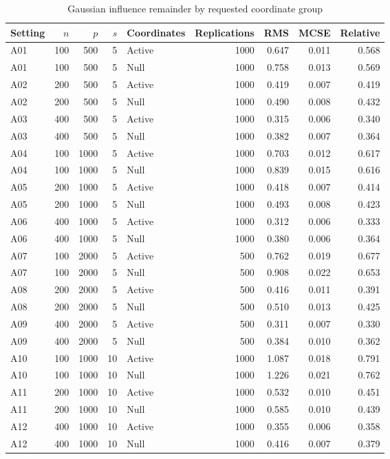 
\begin{longtable}[t]{lrrrlrrrr}
\caption{\label{tab:gaussian-remainder}Gaussian influence remainder by requested coordinate group}\\
\toprule
Setting & $n$ & $p$ & $s$ & Coordinates & Replications & RMS & MCSE & Relative\\
\midrule
A01 & 100 & 500 & 5 & Active & 1000 & 0.647 & 0.011 & 0.568\\
A01 & 100 & 500 & 5 & Null & 1000 & 0.758 & 0.013 & 0.569\\
A02 & 200 & 500 & 5 & Active & 1000 & 0.419 & 0.007 & 0.419\\
A02 & 200 & 500 & 5 & Null & 1000 & 0.490 & 0.008 & 0.432\\
A03 & 400 & 500 & 5 & Active & 1000 & 0.315 & 0.006 & 0.340\\
A03 & 400 & 500 & 5 & Null & 1000 & 0.382 & 0.007 & 0.364\\
A04 & 100 & 1000 & 5 & Active & 1000 & 0.703 & 0.012 & 0.617\\
A04 & 100 & 1000 & 5 & Null & 1000 & 0.839 & 0.015 & 0.616\\
A05 & 200 & 1000 & 5 & Active & 1000 & 0.418 & 0.007 & 0.414\\
A05 & 200 & 1000 & 5 & Null & 1000 & 0.493 & 0.008 & 0.423\\
A06 & 400 & 1000 & 5 & Active & 1000 & 0.312 & 0.006 & 0.333\\
A06 & 400 & 1000 & 5 & Null & 1000 & 0.380 & 0.006 & 0.364\\
A07 & 100 & 2000 & 5 & Active & 500 & 0.762 & 0.019 & 0.677\\
A07 & 100 & 2000 & 5 & Null & 500 & 0.908 & 0.022 & 0.653\\
A08 & 200 & 2000 & 5 & Active & 500 & 0.416 & 0.011 & 0.391\\
A08 & 200 & 2000 & 5 & Null & 500 & 0.510 & 0.013 & 0.425\\
A09 & 400 & 2000 & 5 & Active & 500 & 0.311 & 0.007 & 0.330\\
A09 & 400 & 2000 & 5 & Null & 500 & 0.384 & 0.010 & 0.362\\
A10 & 100 & 1000 & 10 & Active & 1000 & 1.087 & 0.018 & 0.791\\
A10 & 100 & 1000 & 10 & Null & 1000 & 1.226 & 0.021 & 0.762\\
A11 & 200 & 1000 & 10 & Active & 1000 & 0.532 & 0.010 & 0.451\\
A11 & 200 & 1000 & 10 & Null & 1000 & 0.585 & 0.010 & 0.439\\
A12 & 400 & 1000 & 10 & Active & 1000 & 0.355 & 0.006 & 0.358\\
A12 & 400 & 1000 & 10 & Null & 1000 & 0.416 & 0.007 & 0.379\\
\bottomrule
\end{longtable}
